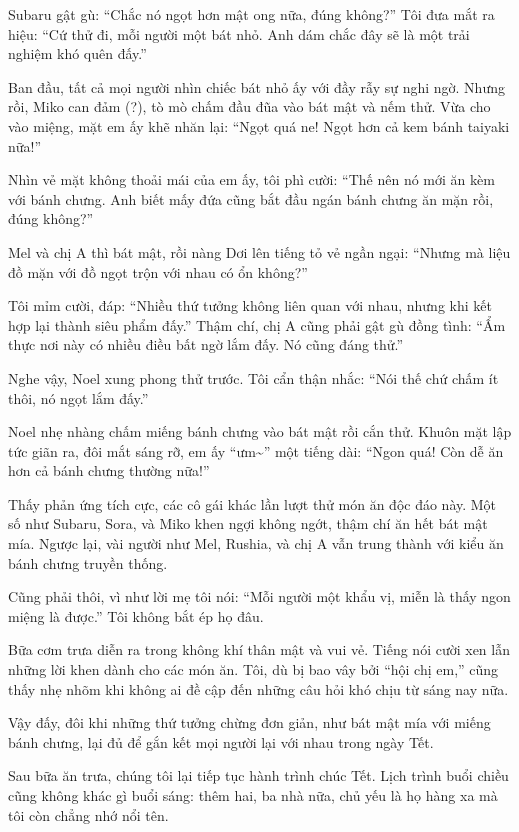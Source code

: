 \documentclass[../main.tex]{subfiles}
\begin{document}
Subaru gật gù: ``Chắc nó ngọt hơn mật ong nữa, đúng không?'' Tôi đưa mắt ra hiệu: ``Cứ thử đi, mỗi người một bát nhỏ. Anh dám chắc đây sẽ là một trải nghiệm khó quên đấy.''

Ban đầu, tất cả mọi người nhìn chiếc bát nhỏ ấy với đầy rẫy sự nghi ngờ. Nhưng rồi, Miko can đảm (?), tò mò chấm đầu đũa vào bát mật và nếm thử. Vừa cho vào miệng, mặt em ấy khẽ nhăn lại: ``Ngọt quá ne! Ngọt hơn cả kem bánh taiyaki nữa!''

Nhìn vẻ mặt không thoải mái của em ấy, tôi phì cười: ``Thế nên nó mới ăn kèm với bánh chưng. Anh biết mấy đứa cũng bắt đầu ngán bánh chưng ăn mặn rồi, đúng không?''

Mel và chị A thì bát mật, rồi nàng Dơi lên tiếng tỏ vẻ ngần ngại: ``Nhưng mà liệu đồ mặn với đồ ngọt trộn với nhau có ổn không?''

Tôi mỉm cười, đáp: ``Nhiều thứ tưởng không liên quan với nhau, nhưng khi kết hợp lại thành siêu phẩm đấy.'' Thậm chí, chị A cũng phải gật gù đồng tình: ``Ẩm thực nơi này có nhiều điều bất ngờ lắm đấy. Nó cũng đáng thử.''

Nghe vậy, Noel xung phong thử trước. Tôi cẩn thận nhắc: ``Nói thế chứ chấm ít thôi, nó ngọt lắm đấy.''

Noel nhẹ nhàng chấm miếng bánh chưng vào bát mật rồi cắn thử. Khuôn mặt lập tức giãn ra, đôi mắt sáng rỡ, em ấy ``ưm\~{}'' một tiếng dài: ``Ngon quá! Còn dễ ăn hơn cả bánh chưng thường nữa!''

Thấy phản ứng tích cực, các cô gái khác lần lượt thử món ăn độc đáo này. Một số như Subaru, Sora, và Miko khen ngợi không ngớt, thậm chí ăn hết bát mật mía. Ngược lại, vài người như Mel, Rushia, và chị A vẫn trung thành với kiểu ăn bánh chưng truyền thống.

Cũng phải thôi, vì như lời mẹ tôi nói: ``Mỗi người một khẩu vị, miễn là thấy ngon miệng là được.'' Tôi không bắt ép họ đâu.

Bữa cơm trưa diễn ra trong không khí thân mật và vui vẻ. Tiếng nói cười xen lẫn những lời khen dành cho các món ăn. Tôi, dù bị bao vây bởi ``hội chị em,'' cũng thấy nhẹ nhõm khi không ai đề cập đến những câu hỏi khó chịu từ sáng nay nữa.

Vậy đấy, đôi khi những thứ tưởng chừng đơn giản, như bát mật mía với miếng bánh chưng, lại đủ để gắn kết mọi người lại với nhau trong ngày Tết.

\ct

Sau bữa ăn trưa, chúng tôi lại tiếp tục hành trình chúc Tết. Lịch trình buổi chiều cũng không khác gì buổi sáng: thêm hai, ba nhà nữa, chủ yếu là họ hàng xa mà tôi còn chẳng nhớ nổi tên.
\end{document}
